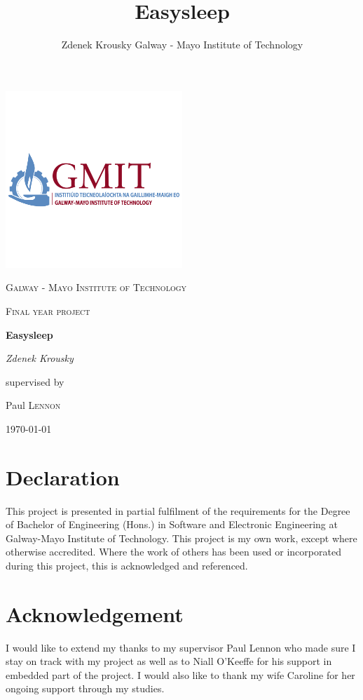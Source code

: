 \documentclass[12pt,a4paper]{article}
\author{Zdenek Krousky
	Galway - Mayo Institute of Technology}
\title{Easysleep}
\begin{document}
	\begin{titlepage}
		\centering
		\includegraphics[width=0.5\textwidth]{gmit_full1.png}\par\vspace{0cm}
		{\scshape\LARGE Galway - Mayo Institute of Technology \par}
		\vspace{1cm}
		{\scshape\Large Final year project\par}
		\vspace{1.5cm}
		{\huge\bfseries Easysleep\par}
		\vspace{2cm}
		{\Large\itshape Zdenek Krousky\par}
		\vfill
		supervised by\par
		Paul \textsc{Lennon}
		
		\vfill
		
		{\large \today\par}
	\end{titlepage}
	
	\newpage
	\newpage
	
	\section*{Declaration}
	This project is presented in partial fulfilment of the requirements for the Degree of Bachelor of Engineering (Hons.) in Software and Electronic Engineering at Galway-Mayo Institute of Technology. This project is my own work, except where otherwise accredited. Where the work of others has been used or incorporated during this project, this is acknowledged and referenced.
	\newpage
	
	\section*{Acknowledgement}
	I would like to extend my thanks to my supervisor Paul Lennon who made sure I stay on track with my project as well as to Niall O'Keeffe for his support in embedded part of the project. I would also like to thank my wife Caroline for her ongoing support through my studies.
	\newpage
	\tableofcontents
	\newpage
	
\end{document}
